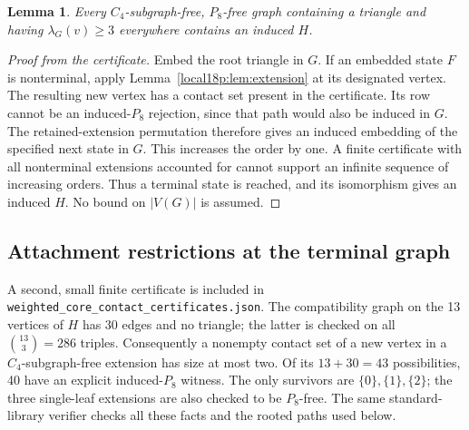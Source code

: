 \documentclass[11pt,a4paper]{article}
\newtheorem{lemma}[theorem]{Lemma}
\theoremstyle{definition}\newtheorem{definition}[theorem]{Definition}
\theoremstyle{remark}\newtheorem{remark}[theorem]{Remark}
\begin{document}
\begin{lemma}\label{local18p:lem:contains}
Every $C_4$-subgraph-free, $P_8$-free graph containing a triangle and
having $\lambda_G(v)\ge3$ everywhere contains an induced $H$.
\end{lemma}
\begin{proof}[Proof from the certificate]
Embed the root triangle in $G$. If an embedded state $F$ is nonterminal,
apply Lemma~\ref{local18p:lem:extension} at its designated vertex. The resulting
new vertex has a contact set present in the certificate. Its row cannot
be an induced-$P_8$ rejection, since that path would also be induced in
$G$. The retained-extension permutation therefore gives an induced
embedding of the specified next state in $G$. This increases the order
by one. A finite certificate with all nonterminal extensions accounted
for cannot support an infinite sequence of increasing orders. Thus a
terminal state is reached, and its isomorphism gives an induced $H$.
No bound on $|V(G)|$ is assumed.
\end{proof}

\subsection{Attachment restrictions at the terminal graph}
A second, small finite certificate is included in
\texttt{weighted\_core\_contact\_certificates.json}. The compatibility
graph on the 13 vertices of $H$ has 30 edges and no triangle; the latter
is checked on all $\binom{13}{3}=286$ triples. Consequently a nonempty
contact set of a new vertex in a $C_4$-subgraph-free extension has size
at most two. Of its $13+30=43$ possibilities, 40 have an explicit
induced-$P_8$ witness. The only survivors are
$\{0\},\{1\},\{2\}$; the three single-leaf extensions are also checked
to be $P_8$-free. The same standard-library verifier checks all these
facts and the rooted paths used below.
\end{document}
